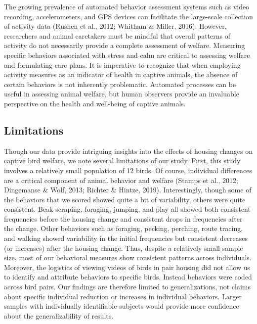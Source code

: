 \documentclass[
  pub]{apa6}
\begin{document}
The growing prevalence of automated behavior assessment systems such as video recording, accelerometers, and GPS devices can facilitate the large-scale collection of activity data (Rushen et al., 2012; Whitham \& Miller, 2016). However, researchers and animal caretakers must be mindful that overall patterns of activity do not necessarily provide a complete assessment of welfare. Measuring specific behaviors associated with stress and calm are critical to assessing welfare and formulating care plans. It is imperative to recognize that when employing activity measures as an indicator of health in captive animals, the absence of certain behaviors is not inherently problematic. Automated processes can be useful in assessing animal welfare, but human observers provide an invaluable perspective on the health and well-being of captive animals.

\hypertarget{limitations}{%
\subsection{Limitations}\label{limitations}}

Though our data provide intriguing insights into the effects of housing changes on captive bird welfare, we note several limitations of our study. First, this study involves a relatively small population of 12 birds. Of course, individual differences are a critical component of animal behavior and welfare (Stamps et al., 2012; Dingemanse \& Wolf, 2013; Richter \& Hintze, 2019). Interestingly, though some of the behaviors that we scored showed quite a bit of variability, others were quite consistent. Beak scraping, foraging, jumping, and play all showed both consistent frequencies before the housing change and consistent drops in frequencies after the change. Other behaviors such as foraging, pecking, perching, route tracing, and walking showed variability in the initial frequencies but consistent decreases (or increases) after the housing change. Thus, despite a relatively small sample size, most of our behavioral measures show consistent patterns across individuals. Moreover, the logistics of viewing videos of birds in pair housing did not allow us to identify and attribute behaviors to specific birds. Instead behaviors were coded across bird pairs. Our findings are therefore limited to generalizations, not claims about specific individual reduction or increases in individual behaviors. Larger samples with individually identifiable subjects would provide more confidence about the generalizability of results.
\end{document}
